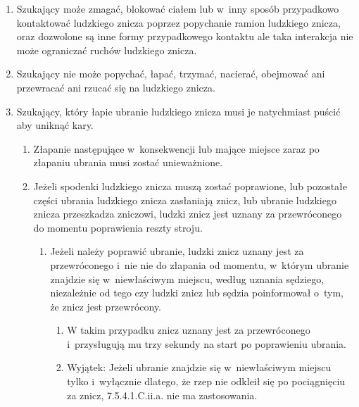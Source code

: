 \documentclass[12pt,a4paper]{article}
\begin{document}
\begin{enumerate}
	\item
	      Szukający może zmagać, blokować ciałem lub w~inny sposób
	      przypadkowo kontaktować ludzkiego znicza poprzez popychanie ramion
	      ludzkiego znicza, oraz dozwolone są inne formy przypadkowego kontaktu
	      ale taka interakcja nie może ograniczać ruchów ludzkiego znicza.
	\item
	      Szukający nie może popychać, łapać, trzymać, nacierać, obejmować ani
	      przewracać ani rzucać się na ludzkiego znicza.
	\item
	      Szukający, który łapie ubranie ludzkiego znicza musi je natychmiast
	      puścić aby uniknąć kary.

	      \begin{enumerate}
		      \item
		            Złapanie następujące w~konsekwencji lub mające miejsce zaraz po
		            złapaniu ubrania musi zostać unieważnione.
		      \item
		            Jeżeli spodenki ludzkiego znicza muszą zostać poprawione, lub
		            pozostałe części ubrania ludzkiego znicza zasłaniają znicz, lub
		            ubranie ludzkiego znicza przeszkadza zniczowi, ludzki znicz jest
		            uznany za przewróconego do momentu poprawienia reszty stroju.

		            \begin{enumerate}
			            \item
			                  Jeżeli należy poprawić ubranie, ludzki znicz uznany jest za
			                  przewróconego i~nie nie do złapania od momentu, w~którym
			                  ubranie znajdzie się w~niewłaściwym miejscu, według uznania
			                  sędziego, niezależnie od tego czy ludzki znicz lub sędzia
			                  poinformował o~tym, że znicz jest przewrócony.

			                  \begin{enumerate}
				                  \item
				                        W takim przypadku znicz uznany jest za przewróconego i~przysługują mu trzy sekundy na start po poprawieniu ubrania.
				                  \item
				                        Wyjątek: Jeżeli ubranie znajdzie się w~niewłaściwym miejscu
				                        tylko i~wyłącznie dlatego, że rzep nie odkleił się po
				                        pociągnięciu za znicz, 7.5.4.1.C.ii.a. nie ma zastosowania.
			                  \end{enumerate}
		            \end{enumerate}
	      \end{enumerate}
\end{enumerate}
\end{document}
